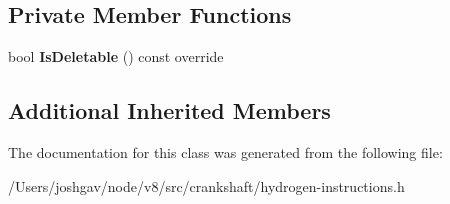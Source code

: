\subsection*{Private Member Functions}
\begin{DoxyCompactItemize}
\item 
bool {\bfseries Is\+Deletable} () const  override\hypertarget{classv8_1_1internal_1_1_h_this_function_acb8281dbbc731c89f56d4747b0c8dd8f}{}\label{classv8_1_1internal_1_1_h_this_function_acb8281dbbc731c89f56d4747b0c8dd8f}

\end{DoxyCompactItemize}
\subsection*{Additional Inherited Members}


The documentation for this class was generated from the following file\+:\begin{DoxyCompactItemize}
\item 
/\+Users/joshgav/node/v8/src/crankshaft/hydrogen-\/instructions.\+h\end{DoxyCompactItemize}
